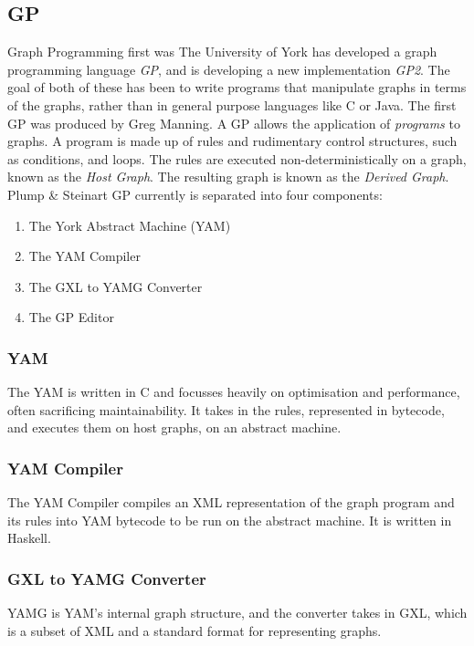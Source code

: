 \documentclass{UoYCSproject}
\begin{document}
\subsection{GP}
Graph Programming first was %
The University of York has developed a graph programming language \emph{GP}, and is developing a new implementation \emph{GP2}. The goal of both of these has been to write programs that manipulate graphs in terms of the graphs, rather than in general purpose languages like C or Java. The first GP was produced by Greg Manning. %
A GP allows the application of \emph{programs} to graphs. A program is made up of rules and rudimentary control structures, such as conditions, and loops. The rules are executed non-deterministically on a graph, known as the \emph{Host Graph}. The resulting graph is known as the \emph{Derived Graph}.
Plump \& Steinart
GP currently is separated into four components:
\begin{enumerate}
  \item The York Abstract Machine (YAM)
  \item The YAM Compiler
  \item The GXL to YAMG Converter
  \item The GP Editor
\end{enumerate}
\subsubsection{YAM}
The YAM is written in C and focusses heavily on optimisation and performance, often sacrificing maintainability. It takes in the rules, represented in bytecode, and executes them on host graphs, on an abstract machine.
\subsubsection{YAM Compiler}
The YAM Compiler compiles an XML representation of the graph program and its rules into YAM bytecode to be run on the abstract machine. It is written in Haskell.
\subsubsection{GXL to YAMG Converter}
YAMG is YAM's internal graph structure, and the converter takes in GXL, which is a subset of XML and a standard format for representing graphs.
\end{document}
